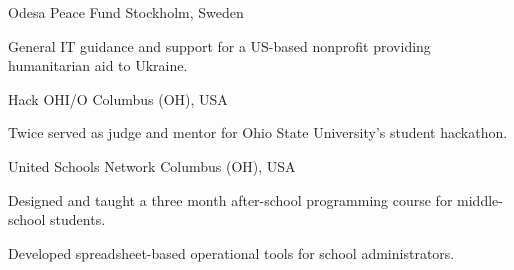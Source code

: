 

\begin{cventries}

  \cventryshort
    {Odesa Peace Fund} %
    {Stockholm, Sweden} %
    {
      \begin{cvitems} %
        \item {General IT guidance and support for a US-based nonprofit providing humanitarian aid to Ukraine.}
      \end{cvitems}
    }

  \cventryshort
    {Hack OHI/O} %
    {Columbus (OH), USA} %
    {
      \begin{cvitems} %
        \item {Twice served as judge and mentor for Ohio State University's student hackathon.}
      \end{cvitems}
    }

  \cventryshort
    {United Schools Network} %
    {Columbus (OH), USA} %
    {
      \begin{cvitems} %
        \item {Designed and taught a three month after-school programming course for middle-school students.}
        \item {Developed spreadsheet-based operational tools for school administrators.}
      \end{cvitems}
    }

\end{cventries}
